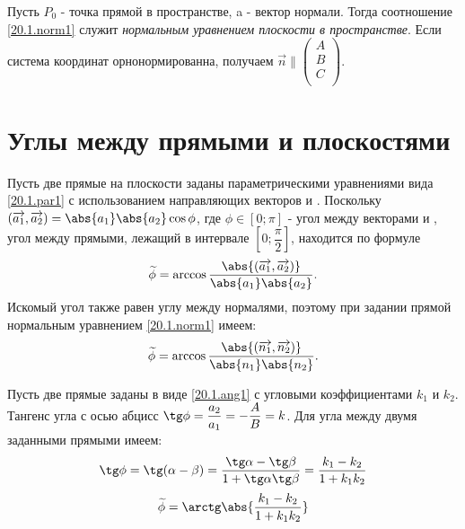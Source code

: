   Пусть $P_0$ - точка прямой в пространстве, a  - вектор нормали. Тогда соотношение \ref{20.1.norm1} служит \textit{нормальным уравнением плоскости в пространстве}. Если система координат орнонормированна, получаем $\overrightarrow{n}\parallel\left(\begin{array}{crl}
A\\
B\\
C\\
\end{array}\right)$.

\section{Углы между прямыми и плоскостями}

  Пусть две прямые на плоскости заданы параметрическими уравнениями вида \ref{20.1.par1} с использованием направляющих векторов  и . Поскольку $(\overrightarrow{a_1},\overrightarrow{a_2})=\abs{a_1}\abs{a_2}\cos \phi$, где $\phi \in \left[0;\pi\right]$ - угол между векторами  и , угол между прямыми, лежащий в интервале $\left[0;\dfrac \pi 2\right]$, находится по формуле
  \begin{equation}\label{20.2.directions}
  \widetilde\phi=\arccos\dfrac{\abs{(\overrightarrow{a_1},\overrightarrow{a_2})}}{\abs{a_1}\abs{a_2}}.
  \end{equation}
  Искомый угол также равен углу между нормалями, поэтому при задании прямой нормальным уравнением \ref{20.1.norm1} имеем:
  \begin{equation}\label{20.2.normals}
  \widetilde\phi=\arccos\dfrac{\abs{(\overrightarrow{n_1},\overrightarrow{n_2})}}{\abs{n_1}\abs{n_2}}.
  \end{equation}
  
  Пусть две прямые заданы в виде \ref{20.1.ang1} с угловыми коэффициентами $k_1$ и $k_2$. Тангенс угла с осью абцисс $\tg \phi = \dfrac{a_2}{a_1}=-\dfrac{A}{B}=k$. Для угла между двумя заданными прямыми имеем:
  \begin{equation}
  \tg \phi=\tg (\alpha-\beta)=\dfrac{\tg \alpha - \tg \beta}{1+\tg \alpha \tg \beta}=\dfrac{k_1-k_2}{1+k_1k_2}
  \end{equation}
  \begin{equation}\label{20.2.angles}
  \widetilde \phi = \arctg \abs{\dfrac{k_1-k_2}{1+k_1k_2}}
  \end{equation}
  
